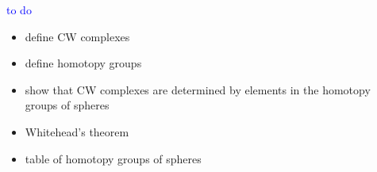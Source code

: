 \documentclass[10pt]{amsart}
\theoremstyle{definition}
\begin{document}
\textcolor{blue}{to do}
\begin{itemize}
    \item define CW complexes
    \item define homotopy groups
    \item show that CW complexes are determined by elements in the homotopy groups of spheres
    \item Whitehead's theorem
    \item table of homotopy groups of spheres
\end{itemize}

\end{document}
